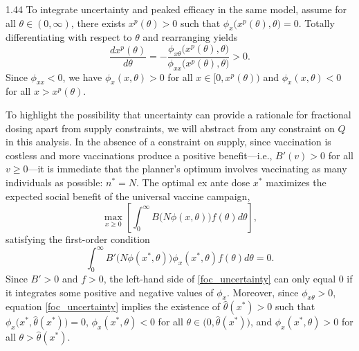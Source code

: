\documentclass[12pt]{article}
\newcommand{\efficacy}{\phi}
\newcommand{\benefit}{B}
\newcommand{\xpeak}{x^{p}}
\begin{document}
\begin{spacing}{1.44}
To integrate uncertainty and peaked efficacy in the same model, assume
for all $\theta \in (0, \infty)$, there exists $\xpeak(\theta) > 0$
such that $\efficacy_{x} \bigl( \xpeak(\theta), \theta \bigr) =
0$. Totally differentiating with respect to $\theta$ and rearranging
yields
\begin{equation}
\label{dxpeak}
\frac{d \xpeak(\theta)}{d \theta} = - \frac{\efficacy_{x\theta} \bigl(
  \xpeak(\theta), \theta \bigr)}{\efficacy_{xx} \bigl( \xpeak(\theta),
  \theta \bigr)} > 0.
\end{equation}
Since $\efficacy_{xx} < 0$, we have $\efficacy_{x}( x, \theta) > 0$
for all $x \in \bigl[ 0, \xpeak(\theta) \bigr)$ and $\efficacy_{x}( x,
  \theta) < 0$ for all $x > \xpeak(\theta)$.
 
To highlight the possibility that uncertainty can provide a rationale
for fractional dosing apart from supply constraints, we will abstract
from any constraint on $Q$ in this analysis. In the absence of a
constraint on supply, since vaccination is costless and more
vaccinations produce a positive benefit---i.e., $\benefit'(v) > 0$ for
all $v \geq 0$---it is immediate that the planner's optimum involves
vaccinating as many individuals as possible: $n^* = N$. The optimal ex
ante dose $x^*$ maximizes the expected social benefit of the universal
vaccine campaign,
\begin{equation}
\label{max_uncertainty}
\max_{x \geq 0} \left[ \int_0^\infty \benefit \! \bigl( N \efficacy(x,
  \theta) \bigr) f(\theta) d\theta \right],
\end{equation}
satisfying the first-order condition
\begin{equation}
\label{foc_uncertainty}
\int_0^\infty \benefit' \! \bigl( N \efficacy(x^*, \theta) \bigr)
\efficacy_x (x^*, \theta) f(\theta) d\theta = 0.
\end{equation}
Since $\benefit' > 0$ and $f > 0$, the left-hand side of
\eqref{foc_uncertainty} can only equal 0 if it integrates some
positive and negative values of $\efficacy_x$. Moreover, since
$\efficacy_{x\theta} > 0$, equation \eqref{foc_uncertainty} implies
the existence of $\hat{\theta}(x^*) > 0$ such that $\efficacy_x \bigl(
x^*, \hat{\theta}(x^*) \bigr) = 0$, $\efficacy_x (x^*, \theta) < 0$
for all $\theta \in \bigl( 0, \hat{\theta}(x^*) \bigr)$, and
$\efficacy_x (x^*, \theta) > 0$ for all $\theta > \hat{\theta}(x^*)$.


\end{spacing}
\end{document}
